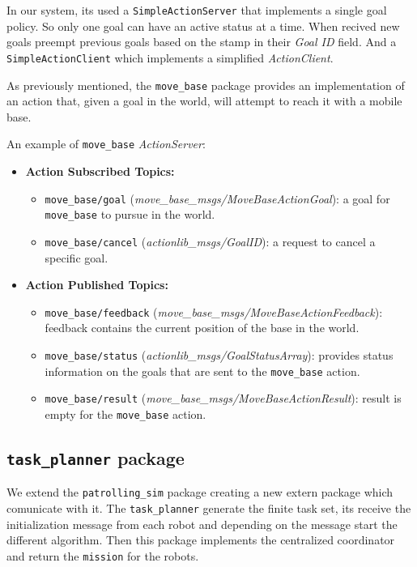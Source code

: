 In our system, its used a \texttt{SimpleActionServer} that implements a single goal policy.
So only one goal can have an active status at a time. When recived new goals preempt previous 
goals based on the stamp in their \textit{Goal ID} field. And a \texttt{SimpleActionClient} which 
implements a simplified \textit{ActionClient}.

As previously mentioned, the \texttt{move\_base} package provides an implementation
of an action that, given a goal in the world, will attempt to reach it with a mobile base.

An example of \texttt{move\_base} \textit{ActionServer}:
\begin{itemize}
    \item {\bf Action Subscribed Topics:}
    \begin{itemize}
        \item \texttt{move\_base/goal} (\textit{move\_base\_msgs/MoveBaseActionGoal}): a goal for \texttt{move\_base} to pursue in the world.
        \item \texttt{move\_base/cancel} (\textit{actionlib\_msgs/GoalID}): a request to cancel a specific goal.
    \end{itemize} 
    \item {\bf Action Published Topics:}
    \begin{itemize}
        \item \texttt{move\_base/feedback} (\textit{move\_base\_msgs/MoveBaseActionFeedback}): feedback contains the current position of the base in the world.
        \item \texttt{move\_base/status} (\textit{actionlib\_msgs/GoalStatusArray}): provides status information on the goals that are sent to the \texttt{move\_base} action.
        \item \texttt{move\_base/result} (\textit{move\_base\_msgs/MoveBaseActionResult}): result is empty for the \texttt{move\_base} action.
    \end{itemize}
\end{itemize}

\subsection{\texttt{task\_planner} package}
We extend the \texttt{patrolling\_sim} package creating a new extern package which 
comunicate with it. 
The \texttt{task\_planner} generate the finite task set, its receive the initialization message 
from each robot and depending on the message start the different algorithm. 
Then this package implements the centralized coordinator and return the \texttt{mission}
for the robots.

